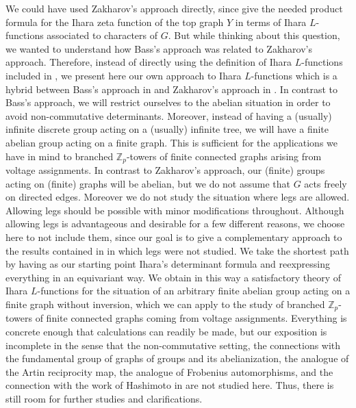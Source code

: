 \documentclass[11pt]{amsart}
\numberwithin{equation}{section}
\theoremstyle{remark}
\theoremstyle{definition}
\begin{document}
We could have used Zakharov's approach directly, since \cite[Proposition 4.14 and Corollary 4.15]{Zakharov:2021} give the needed product formula for the Ihara zeta function of the top graph $Y$ in terms of Ihara $L$-functions associated to characters of $G$.  But while thinking about this question, we wanted to understand how Bass's approach was related to Zakharov's approach.  Therefore, instead of directly using the definition of Ihara $L$-functions included in \cite{Zakharov:2021}, we present here our own approach to Ihara $L$-functions which is a hybrid between Bass's approach in \cite{Bass:1992} and Zakharov's approach in \cite{Zakharov:2021}.  In contrast to Bass's approach, we will restrict ourselves to the abelian situation in order to avoid non-commutative determinants.  Moreover, instead of having a (usually) infinite discrete group acting on a (usually) infinite tree, we will have a finite abelian group acting on a finite graph.  This is sufficient for the applications we have in mind to branched $\mathbb{Z}_{p}$-towers of finite connected graphs arising from voltage assignments.  In contrast to Zakharov's approach, our (finite) groups acting on (finite) graphs will be abelian, but we do not assume that $G$ acts freely on directed edges.  Moreover we do not study the situation where legs are allowed.  Allowing legs should be possible with minor modifications throughout.  Although allowing legs is advantageous and desirable for a few different reasons, we choose here to not include them, since our goal is to give a complementary approach to the results contained in \cite{Gambheera/Vallieres:2024} in which legs were not studied.  We take the shortest path by having as our starting point Ihara's determinant formula and reexpressing everything in an equivariant way.  We obtain in this way a satisfactory theory of Ihara $L$-functions for the situation of an arbitrary finite abelian group acting on a finite graph without inversion, which we can apply to the study of branched $\mathbb{Z}_{p}$-towers of finite connected graphs coming from voltage assignments.  Everything is concrete enough that calculations can readily be made, but our exposition is incomplete in the sense that the non-commutative setting, the connections with the fundamental group of graphs of groups and its abelianization, the analogue of the Artin reciprocity map, the analogue of Frobenius automorphisms, and the connection with the work of Hashimoto in \cite{Hashimoto:1992} are not studied here.  Thus, there is still room for further studies and clarifications.  
\end{document}
